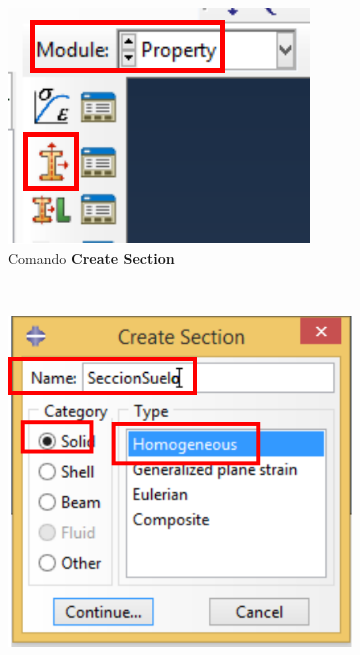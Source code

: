  \begin{figure}
    \centering
    \begin{subfigure}[!h]{0.20\textwidth}
      \includegraphics[width=\textwidth]{./body/images/prop03p.pdf}
      \caption{Comando \textbf{Create Section}}
      \label{prop03p}
    \end{subfigure}%
    ~
    \begin{subfigure}[!h]{0.39\textwidth}
      \includegraphics[width=\textwidth]{./body/images/prop04.pdf}

\end{subfigure}
\end{figure}
